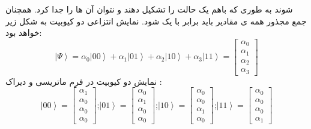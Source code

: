  شوند به طوری که باهم یک حالت را تشکیل دهند و نتوان آن ها را جدا کرد. 
\cite{fundamentalsandapplications}
همچنان جمع مجذور همه ی مقادیر باید برابر با یک شود. نمایش انتزاعی دو کیوبیت به شکل زیر خواهد بود:
\begin{equation}
\left|\Psi\right\rangle = \alpha_{0}\left|00\right\rangle +  \alpha_{1}\left|01\right\rangle +  \alpha_{2}\left|10\right\rangle +  \alpha_{3}\left|11\right\rangle = \begin{bmatrix}
 \alpha_{0}
\\
 \alpha_{1}
\\
 \alpha_{2}
\\
 \alpha_{3}
\end{bmatrix}
\end{equation}
نمایش دو کیوبیت در فرم ماتریسی و دیراک
:
\begin{equation}
\left|00\right\rangle  = \begin{bmatrix}
 \alpha_{1}
\\
 \alpha_{0}
\\
 \alpha_{0}
\\
 \alpha_{0}
\end{bmatrix}
\text{;}
\left|01\right\rangle  = \begin{bmatrix}
 \alpha_{0}
\\
 \alpha_{1}
\\
 \alpha_{0}
\\
 \alpha_{0}
\end{bmatrix}
\text{;}
\left|10\right\rangle  = \begin{bmatrix}
 \alpha_{0}
\\
 \alpha_{0}
\\
 \alpha_{1}
\\
 \alpha_{0}
\end{bmatrix}
\text{;}
\left|11\right\rangle  = \begin{bmatrix}
 \alpha_{0}
\\
 \alpha_{0}
\\
 \alpha_{0}
\\
 \alpha_{1}
\end{bmatrix}
\end{equation}



